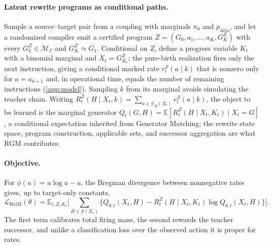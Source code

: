 \documentclass{article}
\newcommand{\rgm}{\textsc{RGM}\xspace}
\newcommand{\M}{\mathcal{M}_{\Gamma}}
\newcommand{\Sset}{\mathcal{S}}
\newcommand{\pdata}{p_{\mathrm{data}}}
\newcommand{\pzero}{\pi_0}
\newcommand{\E}{\mathbb{E}}
\newcommand{\Gset}{\mathcal{G}}
\theoremstyle{definition}
\theoremstyle{remark}
\begin{document}
\paragraph{Latent rewrite programs as conditional paths.}
Sample a source--target pair from a coupling with marginals $\pzero$ and $\pdata$, and let a randomized compiler emit a certified program $Z=(G_0,a_1,\ldots,a_K,G^Z_K)$ with every $G^Z_{k}\in\M$ and $G^Z_K\simeq G_1$. Conditional on $Z$, define a progress variable $K_t$ with a binomial marginal and $X_t=G^Z_{K_t}$; the pure-birth realization fires only the next instruction, giving a conditional marked rate $r^Z_t(a\mid k)$ that is nonzero only for $a=a_{k+1}$ and, in operational time, equals the number of remaining instructions (\cref{app:model}). Sampling $k$ from its marginal avoids simulating the teacher chain. Writing $R^Z_t(H\mid X_t,k)=\sum_{a\in\Gset_H(X_t)}r^Z_t(a\mid k)$, the object to be learned is the marginal generator $Q_t(G,H)=\E[R^Z_t(H\mid X_t,K_t)\mid X_t=G]$, a conditional expectation inherited from Generator Matching; the rewrite state space, program construction, applicable sets, and successor aggregation are what \rgm contributes.

\paragraph{Objective.}
For $\phi(u)=u\log u-u$, the Bregman divergence between nonnegative rates gives, up to target-only constants,
\begin{equation}
\mathcal L_{\mathrm{RGM}}(\theta)=
\E_{t,Z,K_t}\Big[\textstyle\sum_{H\in\Sset(X_t)}
\Big\{Q_{\theta,t}(X_t,H)-R^Z_t(H\mid X_t,K_t)\log Q_{\theta,t}(X_t,H)\Big\}\Big].
\label{eq:gm-objective}
\end{equation}
The first term calibrates total firing mass, the second rewards the teacher successor, and unlike a classification loss over the observed action it is proper for rates.
\end{document}
